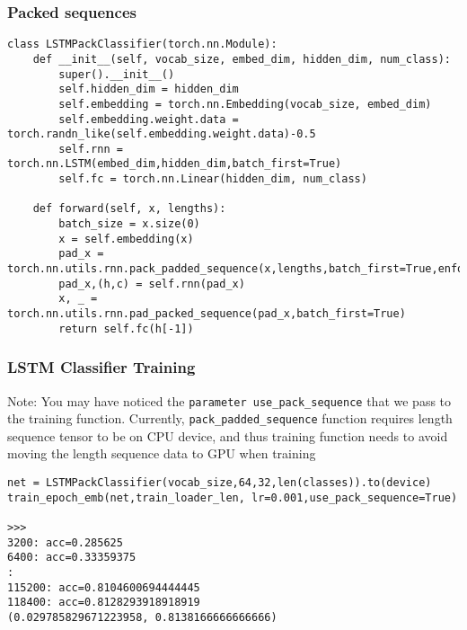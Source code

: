 \begin{frame}[fragile] \frametitle{Packed sequences}



\begin{lstlisting}
class LSTMPackClassifier(torch.nn.Module):
    def __init__(self, vocab_size, embed_dim, hidden_dim, num_class):
        super().__init__()
        self.hidden_dim = hidden_dim
        self.embedding = torch.nn.Embedding(vocab_size, embed_dim)
        self.embedding.weight.data = torch.randn_like(self.embedding.weight.data)-0.5
        self.rnn = torch.nn.LSTM(embed_dim,hidden_dim,batch_first=True)
        self.fc = torch.nn.Linear(hidden_dim, num_class)

    def forward(self, x, lengths):
        batch_size = x.size(0)
        x = self.embedding(x)
        pad_x = torch.nn.utils.rnn.pack_padded_sequence(x,lengths,batch_first=True,enforce_sorted=False)
        pad_x,(h,c) = self.rnn(pad_x)
        x, _ = torch.nn.utils.rnn.pad_packed_sequence(pad_x,batch_first=True)
        return self.fc(h[-1])
\end{lstlisting}

\end{frame}

\begin{frame}[fragile] \frametitle{LSTM Classifier Training}

Note: You may have noticed the \lstinline|parameter use_pack_sequence| that we pass to the training function. Currently, \lstinline|pack_padded_sequence| function requires length sequence tensor to be on CPU device, and thus training function needs to avoid moving the length sequence data to GPU when training

\begin{lstlisting}
net = LSTMPackClassifier(vocab_size,64,32,len(classes)).to(device)
train_epoch_emb(net,train_loader_len, lr=0.001,use_pack_sequence=True)

>>>
3200: acc=0.285625
6400: acc=0.33359375
:
115200: acc=0.8104600694444445
118400: acc=0.8128293918918919
(0.029785829671223958, 0.8138166666666666)
\end{lstlisting}



\end{frame}

